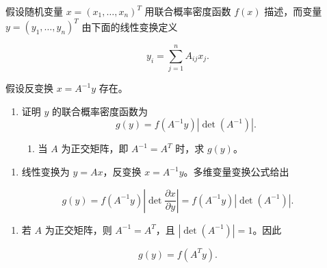 \begin{question}
假设随机变量 \(x=(x_1,\ldots,x_n)^T\) 用联合概率密度函数 \(f(x)\) 描述，而变量 \(y=(y_1,\ldots,y_n)^T\) 由下面的线性变换定义

\[
y_i=\sum_{j=1}^{n} A_{ij}x_j.
\]

假设反变换 \(x=A^{-1}y\) 存在。

\begin{enumerate}
\item 证明 \(y\) 的联合概率密度函数为
\[
g(y)=f(A^{-1}y)\left|\det(A^{-1})\right|.
\]

\begin{enumerate}[start=2]
\item
  当 \(A\) 为正交矩阵，即 \(A^{-1}=A^T\) 时，求 \(g(y)\)。
\end{enumerate}
\end{enumerate}
\begin{solution}
\begin{enumerate}
\item
  线性变换为 \(y=Ax\)，反变换 \(x=A^{-1}y\)。多维变量变换公式给出
\end{enumerate}

\[
g(y)=f(A^{-1}y)\left|\det\frac{\partial x}{\partial y}\right|
=f(A^{-1}y)|\det(A^{-1})|.
\]

\begin{enumerate}[start=2]
\item
  若 \(A\) 为正交矩阵，则 \(A^{-1}=A^T\)，且 \(|\det(A^{-1})|=1\)。因此
\end{enumerate}

\[
g(y)=f(A^Ty).
\]
\end{solution}
\end{question}


